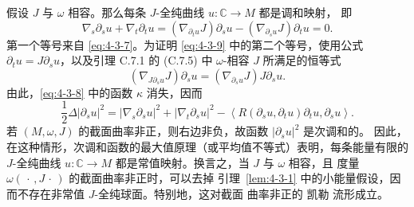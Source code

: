 \begin{remark}\label{rem:4-3-6}
假设 $J$ 与 $\omega$ 相容。那么每条 $J$-全纯曲线 $u:\mathbb C\to M$ 都是调和映射，
即
\begin{equation}\label{eq:4-3-9}
  \nabla_s\partial_su+\nabla_t\partial_tu
  =
  (\nabla_{\partial_tu}J)\partial_su
  -(\nabla_{\partial_su}J)\partial_tu
  =0.
\end{equation}
第一个等号来自 \eqref{eq:4-3-7}。为证明 \eqref{eq:4-3-9} 中的第二个等号，使用公式
$\partial_tu=J\partial_su$，以及引理 C.7.1 的 \textup{(C.7.5)} 中
$\omega$-相容 $J$ 所满足的恒等式
\[
  (\nabla_{J\partial_su}J)\partial_su
  =
  (\nabla_{\partial_su}J)J\partial_su.
\]
由此，\eqref{eq:4-3-8} 中的函数 $\kappa$ 消失，因而
\begin{equation}\label{eq:4-3-10}
  \frac12\Delta|\partial_su|^2
  =
  |\nabla_s\partial_su|^2
  +|\nabla_t\partial_su|^2
  -\left\langle
    R(\partial_su,\partial_tu)\partial_tu,\partial_su
  \right\rangle.
\end{equation}
若 $(M,\omega,J)$ 的截面曲率非正，则右边非负，故函数 $|\partial_su|^2$ 是次调和的。
因此，在这种情形，次调和函数的最大值原理（或平均值不等式）表明，每条能量有限的
$J$-全纯曲线 $u:\mathbb C\to M$ 都是常值映射。换言之，当 $J$ 与 $\omega$ 相容，且
度量 $\omega(\,\cdot\,,J\,\cdot\,)$ 的截面曲率非正时，可以去掉
引理~\ref{lem:4-3-1} 中的小能量假设，因而不存在非常值 $J$-全纯球面。特别地，这对截面
曲率非正的 凯勒 流形成立。
\end{remark}
